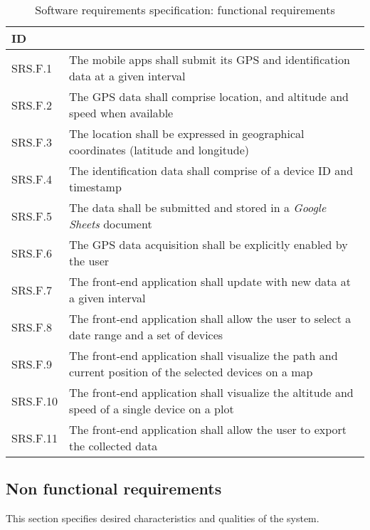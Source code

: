 \begin{table}[H]
\centerfloat
\begin{tabular}{@{} m{4em} >{\small}m{34em} @{}}
	\toprule
	ID			& \normalfont{Description} \\
	\midrule
	SRS.F.1		& The mobile apps shall submit its GPS and identification data at a given interval \\
	SRS.F.2		& The GPS data shall comprise location, and altitude and speed when available \\
	SRS.F.3		& The location shall be expressed in geographical coordinates (latitude and longitude) \\
	SRS.F.4		& The identification data shall comprise of a device ID and timestamp \\
	SRS.F.5		& The data shall be submitted and stored in a \emph{Google Sheets} document \\
	SRS.F.6		& The GPS data acquisition shall be explicitly enabled by the user \\
	\midrule
	SRS.F.7		& The front-end application shall update with new data at a given interval \\
	SRS.F.8		& The front-end application shall allow the user to select a date range and a set of devices \\
	SRS.F.9		& The front-end application shall visualize the path and current position of the selected devices on a map \\
	SRS.F.10	& The front-end application shall visualize the altitude and speed of a single device on a plot \\
	SRS.F.11	& The front-end application shall allow the user to export the collected data \\
	\bottomrule
\end{tabular}
\caption{{\footnotesize Software requirements specification: functional requirements}}
\end{table}


\subsection{Non functional requirements}\label{subsec:req_nf}
This section specifies desired characteristics and qualities of the system.

